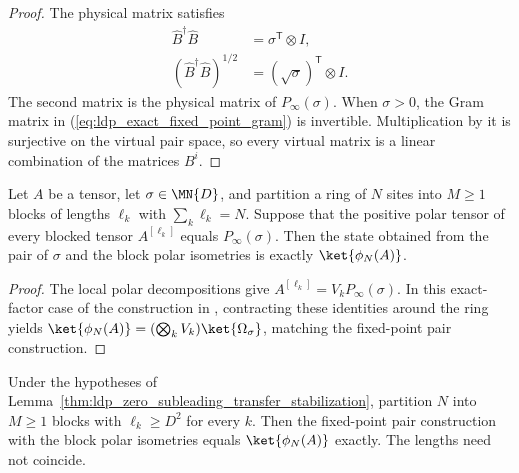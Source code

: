 \begin{proof}\leanok
    The physical matrix satisfies
    \begin{align}
        \widehat B^\dagger\widehat B & =\sigma^{\mathsf T}\otimes I,
        \label{eq:ldp_exact_fixed_point_gram}                               \\
        (\widehat B^\dagger\widehat B)^{1/2}
                                     & =(\sqrt\sigma)^{\mathsf T}\otimes I.
        \label{eq:ldp_exact_fixed_point_sqrt}
    \end{align}
    The second matrix is the physical matrix of $P_\infty(\sigma)$.
    When $\sigma>0$, the Gram matrix in
    (\ref{eq:ldp_exact_fixed_point_gram}) is invertible. Multiplication
    by it is surjective on the virtual pair space, so every virtual matrix
    is a linear combination of the matrices $B^i$.
\end{proof}

\begin{lemma}
    \label{thm:ldp_exact_block_polar_reconstruction}
    \leanok
    Let $A$ be a tensor, let $\sigma\in\MN{D}$, and partition a ring of
    $N$ sites into $M\geq1$ blocks of lengths $\ell_k$ with
    $\sum_k\ell_k=N$. Suppose that the positive polar tensor of every
    blocked tensor $A^{[\ell_k]}$ equals $P_\infty(\sigma)$. Then the
    state obtained from the pair of $\sigma$ and the block polar
    isometries is exactly $\ket{\phi_N(A)}$.
\end{lemma}

\begin{proof}\leanok
    The local polar decompositions give
    $A^{[\ell_k]}=V_kP_\infty(\sigma)$. In this exact-factor case of
    the construction in \cite{Malz2024Preparation}, contracting these
    identities around the ring yields
    $\ket{\phi_N(A)}=(\bigotimes_kV_k)\ket{\Omega_\sigma}$, matching
    the fixed-point pair construction.
\end{proof}

\begin{lemma}
    \label{thm:ldp_zero_subleading_exact_reconstruction}
    \leanok
    Under the hypotheses of
    Lemma~\ref{thm:ldp_zero_subleading_transfer_stabilization},
    partition $N$ into $M\geq1$ blocks with
    $\ell_k\geq D^2$ for every $k$. Then the fixed-point pair
    construction with the block polar isometries equals
    $\ket{\phi_N(A)}$ exactly. The lengths need not coincide.
\end{lemma}

